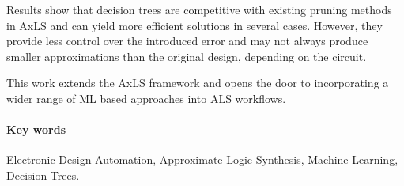 Results show that decision trees are competitive with existing pruning methods
in AxLS and can yield more efficient solutions in several cases. However, they
provide less control over the introduced error and may not always produce
smaller approximations than the original design, depending on the circuit.

This work extends the AxLS framework and opens the door to incorporating a
wider range of ML based approaches into ALS workflows.

\paragraph{Key words}

Electronic Design Automation, Approximate Logic Synthesis, Machine Learning, Decision Trees.
